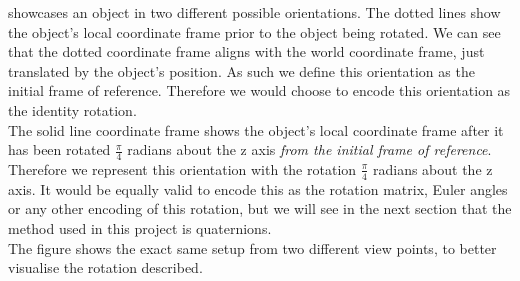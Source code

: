  showcases an object in two different possible orientations. The dotted lines show the object's local coordinate frame prior to the object being rotated. We can see that the dotted coordinate frame aligns with the world coordinate frame, just translated by the object's position. As such we define this orientation as the initial frame of reference. Therefore we would choose to encode this orientation as the identity rotation.\\
The solid line coordinate frame shows the object's local coordinate frame after it has been rotated $\frac{\pi}{4}$ radians about the z axis \textit{from the initial frame of reference}. Therefore we represent this orientation with the rotation $\frac{\pi}{4}$ radians about the z axis. It would be equally valid to encode this as the rotation matrix, Euler angles or any other encoding of this rotation, but we will see in the next section that the method used in this project is quaternions.\\
The figure shows the exact same setup from two different view points, to better visualise the rotation described.


